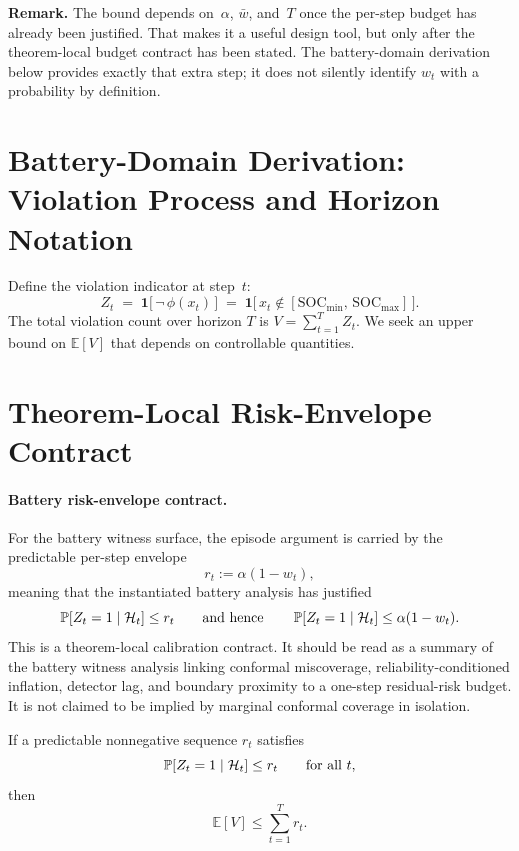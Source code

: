 \noindent\textbf{Remark.}  The bound depends on~$\alpha$, $\bar{w}$, and~$T$
once the per-step budget has already been justified.  That makes it a useful
design tool, but only after the theorem-local budget contract has been stated.
The battery-domain derivation below provides exactly that extra step; it does
not silently identify $w_t$ with a probability by definition.

\section{Battery-Domain Derivation: Violation Process and Horizon Notation}


Define the violation indicator at step~$t$:
\[
  Z_t \;=\; \mathbf{1}\!\bigl[\,\lnot\,\phi(x_t)\,\bigr]
  \;=\; \mathbf{1}\!\bigl[\,x_t \notin
  [\text{SOC}_{\min},\, \text{SOC}_{\max}]\,\bigr].
\]
The total violation count over horizon $T$ is $V = \sum_{t=1}^T Z_t$.
We seek an upper bound on $\mathbb{E}[V]$ that depends on controllable
quantities.

\section{Theorem-Local Risk-Envelope Contract}

\paragraph{Battery risk-envelope contract.}
For the battery witness surface, the episode argument is carried by the
predictable per-step envelope
\[
  r_t := \alpha(1-w_t),
\]
meaning that the instantiated battery analysis has justified
\[
  \operatorname{\mathbb{P}}[Z_t=1\mid\mathcal{H}_t] \le r_t
  \qquad\text{and hence}\qquad
  \operatorname{\mathbb{P}}[Z_t=1\mid\mathcal{H}_t] \le \alpha(1-w_t).
\]
This is a theorem-local calibration contract.  It should be read as a
summary of the battery witness analysis linking conformal miscoverage,
reliability-conditioned inflation, detector lag, and boundary proximity to a
one-step residual-risk budget.  It is not claimed to be implied by marginal
conformal coverage in isolation.

\begin{lemma}
\label{lem:per-step-risk}
If a predictable nonnegative sequence $r_t$ satisfies
\[
  \operatorname{\mathbb{P}}[Z_t = 1 \mid \mathcal{H}_t] \le r_t
  \qquad\text{for all } t,
\]
then
\[
  \mathbb{E}[V] \le \sum_{t=1}^T r_t.
\]
\end{lemma}

